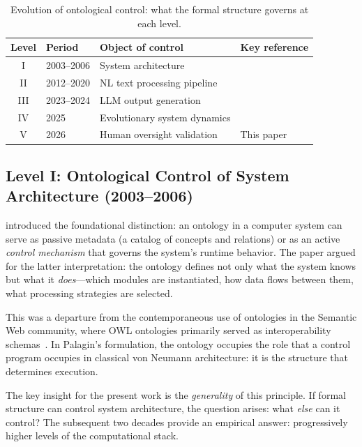\documentclass[11pt]{article}
\begin{document}
\begin{table}[h]
\centering
\caption{Evolution of ontological control: what the formal structure governs at each level.}
\label{tab:evolution}
\begin{tabular}{@{}clll@{}}
\toprule
\textbf{Level} & \textbf{Period} & \textbf{Object of control} & \textbf{Key reference} \\
\midrule
I   & 2003--2006 & System architecture        & \citet{palagin2006architecture} \\
II  & 2012--2020 & NL text processing pipeline & \citet{palagin2012knowledge,palagin2020distributional} \\
III & 2023--2024 & LLM output generation       & \citet{palagin2023ontochatgpt,palagin2024neural} \\
IV  & 2025       & Evolutionary system dynamics & \citet{palagin2025evolutionary} \\
V   & 2026       & Human oversight validation   & This paper \\
\bottomrule
\end{tabular}
\end{table}

\subsection{Level I: Ontological Control of System Architecture (2003--2006)}
\label{sec:level1}

\citet{palagin2006architecture} introduced the foundational distinction: an ontology in a computer system can serve as passive metadata (a catalog of concepts and relations) or as an active \emph{control mechanism} that governs the system's runtime behavior.
The paper argued for the latter interpretation: the ontology defines not only what the system knows but what it \emph{does}---which modules are instantiated, how data flows between them, what processing strategies are selected.

This was a departure from the contemporaneous use of ontologies in the Semantic Web community, where OWL ontologies primarily served as interoperability schemas~\citep{grau2008owl2}.
In Palagin's formulation, the ontology occupies the role that a control program occupies in classical von Neumann architecture: it is the structure that determines execution.

The key insight for the present work is the \emph{generality} of this principle.
If formal structure can control system architecture, the question arises: what \emph{else} can it control?
The subsequent two decades provide an empirical answer: progressively higher levels of the computational stack.
\end{document}
